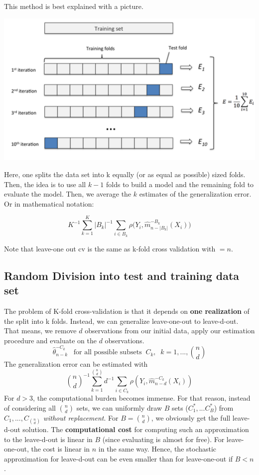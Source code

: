 \documentclass[]{book}
\begin{document}
This method is best explained with a picture.

\includegraphics[width=650px]{figures/k_fold_cv}

Here, one splits the data set into k equally (or as equal as possible)
sized folds. Then, the idea is to use all \(k-1\) folds to build a model
and the remaining fold to evaluate the model. Then, we average the \(k\)
estimates of the generalization error. Or in mathematical notation:

\[K^{-1} \sum\limits_{k = 1}^K |B_k|^{-1} \sum\limits_{i \in B_k}\rho({Y_{i}, \hat{m}^{-B_k}_{n-|B_k|}(X_i))}\]

Note that leave-one out cv is the same as k-fold cross validation with
\(=n\).

\subsection{Random Division into test and training data
set}\label{random-division-into-test-and-training-data-set}

The problem of K-fold cross-validation is that it depends on \textbf{one
realization} of the split into k folds. Instead, we can generalize
leave-one-out to leave-d-out. That means, we remove \(d\) observations
from our initial data, apply our estimation procedure and evaluate on
the \(d\) observations.
\[\hat{\theta}^{-C_k}_{n-k} \;\;\; \text{for all possible subsets}\;\; C_k, \;\; k=1, ..., {\binom{n}{d}}\]
The generalization error can be estimated with
\[{\binom{n}{d}}^{-1}\sum\limits_{k = 1}^{\binom{n}{d}} d^{-1}\sum\limits_{i \in C_k} \rho(Y_i, \hat{m}^{-C_k}_{n-d}(X_i))\]
For \(d > 3\), the computational burden becomes immense. For that
reason, instead of considering all \({\binom{n}{d}}\) sets, we can
uniformly draw \(B\) sets (\(C_1^*, ... C_B^*\)) from
\(C_1, ..., C_{\binom{n}{d}}\) \emph{without replacement}. For
\(B=\binom{n}{d}\), we obviously get the full leave-d-out solution. The
\textbf{computational cost} for computing such an approximation to the
leave-d-out is linear in \(B\) (since evaluating is almost for free).
For leave-one-out, the cost is linear in \(n\) in the same way. Hence,
the stochastic approximation for leave-d-out can be even smaller than
for leave-one-out if \(B < n\).
\end{document}
